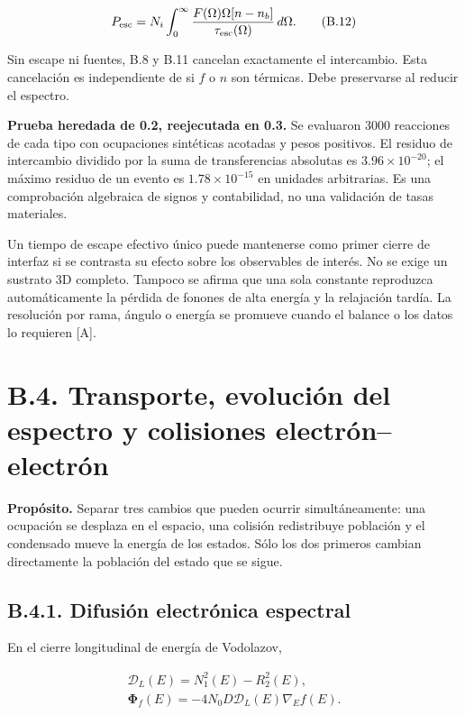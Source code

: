 \documentclass[
  spanish,
  10pt,
  a4paper,
]{article}
\newcounter{none} %
\begin{document}
\[
P_{\rm esc}=N_i\int_0^\infty
\frac{F(\Omega)\Omega[n-n_b]}{\tau_{\rm esc}(\Omega)}\,d\Omega. \tag{B.12}
\]

Sin escape ni fuentes, B.8 y B.11 cancelan exactamente el intercambio.
Esta cancelación es independiente de si \(f\) o \(n\) son térmicas. Debe
preservarse al reducir el espectro.

\textbf{Prueba heredada de 0.2, reejecutada en 0.3.} Se evaluaron 3000
reacciones de cada tipo con ocupaciones sintéticas acotadas y pesos
positivos. El residuo de intercambio dividido por la suma de
transferencias absolutas es \(3.96\times10^{-20}\); el máximo residuo de
un evento es \(1.78\times10^{-15}\) en unidades arbitrarias. Es una
comprobación algebraica de signos y contabilidad, no una validación de
tasas materiales.

Un tiempo de escape efectivo único puede mantenerse como primer cierre
de interfaz si se contrasta su efecto sobre los observables de interés.
No se exige un sustrato 3D completo. Tampoco se afirma que una sola
constante reproduzca automáticamente la pérdida de fonones de alta
energía y la relajación tardía. La resolución por rama, ángulo o energía
se promueve cuando el balance o los datos lo requieren {[}A{]}.

\section{B.4. Transporte, evolución del espectro y colisiones
electrón--electrón}\label{b.4.-transporte-evoluciuxf3n-del-espectro-y-colisiones-electruxf3nelectruxf3n}

\textbf{Propósito.} Separar tres cambios que pueden ocurrir
simultáneamente: una ocupación se desplaza en el espacio, una colisión
redistribuye población y el condensado mueve la energía de los estados.
Sólo los dos primeros cambian directamente la población del estado que
se sigue.

\subsection{B.4.1. Difusión electrónica
espectral}\label{b.4.1.-difusiuxf3n-electruxf3nica-espectral}

En el cierre longitudinal de energía de Vodolazov,

\[
\begin{gathered}
\mathcal D_L(E)=N_1^2(E)-R_2^2(E),\\
\boldsymbol\Phi_f(E)=-4N_0D\mathcal D_L(E)\nabla_E f(E).
\end{gathered} \tag{B.13}
\]
\end{document}

